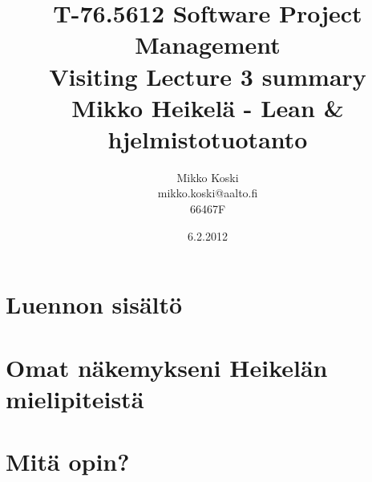 \documentclass[a4paper]{article}
\begin{document}
\title{\small T-76.5612 Software Project Management \\ Visiting Lecture 3 summary \\ \huge Mikko Heikelä - Lean \& hjelmistotuotanto}
\date{6.2.2012}
\author{Mikko Koski \\ mikko.koski@aalto.fi \\ 66467F}
\maketitle

\normalsize

\section{Luennon sisältö}

\section{Omat näkemykseni Heikelän mielipiteistä}

\section{Mitä opin?}
\end{document}

